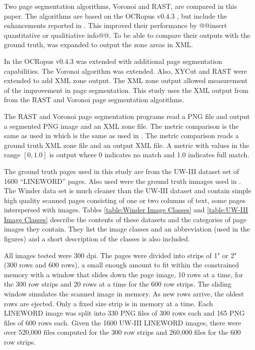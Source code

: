 \documentclass[conference]{IEEEtran}
\begin{document}
Two page segmentation algorithms, Voronoi and RAST, are compared in this paper.
The algorithms are based on the OCRopus v0.4.3  \cite{breuel2008ocropus}, but
include the enhancements reported in \cite{winder2011icdar}. This improved
their performance by @@insert quantitative or qualitiative info@@.  To be able
to compare their outputs with the ground truth, \cite{breuel2008ocropus} was
expanded to output the zone areas in XML.

In \cite{winder2010extending} the OCRopus v0.4.3 was extended with
additional page segmentation capabilities. The Voronoi algorithm was extended.
Also, XYCut and RAST were extended to add XML zone output. The XML zone output
allowed measurement of the improvement in page segmentation.  This study uses
the XML output from \cite{winder2010extending} from the RAST and Voronoi page
segmentation algorithms. 

The RAST and Voronoi page segmentation programs read a PNG file and output a
segmented PNG image and an XML zone file. The metric comparison is the same as
used in \cite{winder2010extending} which is the same as used in
\cite{mao2000pset}\cite{antonacopoulos2007page}. The metric comparison
reads a ground truth XML zone file and an output XML file. A metric with values
in the range $[0, 1.0]$ is output where 0 indicates no match and 1.0 indicates
full match. 

The ground truth pages used in this study are from the UW-III dataset set of
1600 “LINEWORD” pages. Also used were the ground truth inmages used in \cite{winder2010extending}.
The Winder data set is much cleaner than the UW-III dataset
and contain simple high quality scanned pages consisting of one or two
columns of text, some pages interspersed with images. Tables \ref{table:Winder Image Classes} 
and \ref{table:UW-III Image Classes} describe the contents of these datasets
and the categories of page images they contain.  They list the image classes 
and an abbreviation (used in the figures) and a short description of the
classes is also included.

All images tested were 300 dpi.  The pages were divided into strips of 1" or 2" (300 rows and 600 rows),
a small enough amount to fit within the constrained memory with 
a window that slides down the page image, 10 rows at a time, for the 300
row strips and 20 rows at a time for the 600 row strips.  
The sliding window simulates the scanned image in memory. As new rows arrive, the
oldest rows are ejected. 
Only a fixed size strip is in memory at a time. Each
LINEWORD image was split into 330 PNG files of 300 rows each and 165 PNG files
of 600 rows each.  Given the 1600 UW-III LINEWORD images, there were over
520,000 files computed for the 300 row strips and 260,000 files for the 600 row
strips.
\end{document}

